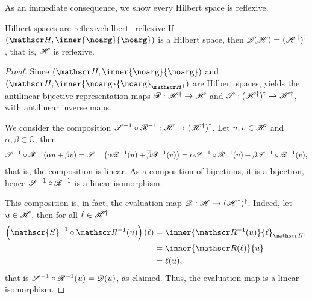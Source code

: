 As an immediate consequence, we show every Hilbert space is reflexive.
\begin{theorem}{Hilbert spaces are reflexive}{hilbert_reflexive}
    If \((\hilbert, \inner{\noarg}{\noarg})\) is a Hilbert space, then \(\mathscr{D}(\mathscr{H}) = (\mathscr{H}^\dag)^\dag\), that is, \(\mathscr{H}\) is reflexive.
\end{theorem}
\begin{proof}
    Since \((\hilbert, \inner{\noarg}{\noarg})\) and \((\hilbert, \inner{\noarg}{\noarg}_{\hilbert^\dag})\) are Hilbert spaces,  yields the antilinear bijective representation maps \(\mathscr{R} : \mathscr{H}^\dag \to \mathscr{H}\) and \(\mathscr{S} : (\mathscr{H}^\dag)^\dag \to \mathscr{H}^\dag\), with antilinear inverse maps.

    We consider the composition \(\mathscr{S}^{-1} \circ \mathscr{R}^{-1} : \mathscr{H} \to (\mathscr{H}^\dag)^\dag\). Let \(u, v \in \mathscr{H}\) and \(\alpha, \beta \in \mathbb{C}\), then
    \begin{equation*}
        \mathscr{S}^{-1} \circ \mathscr{R}^{-1} (\alpha u + \beta v) = \mathscr{S}^{-1}\left(\overline{\alpha} \mathscr{R}^{-1}(u) + \overline{\beta}\mathscr{R}^{-1}(v)\right) = \alpha \mathscr{S}^{-1} \circ \mathscr{R}^{-1}(u) + \beta \mathscr{S}^{-1} \circ \mathscr{R}^{-1}(v),
    \end{equation*}
    that is, the composition is linear. As a composition of bijections, it is a bijection, hence \(\mathscr{S}^{-1} \circ \mathscr{R}^{-1}\) is a linear isomorphism.

    This composition is, in fact, the evaluation map \(\mathscr{D} : \mathscr{H} \to (\mathscr{H}^\dag)^\dag\). Indeed, let \(u \in \mathscr{H}\), then for all \(\ell \in \mathscr{H}^\dag\)
    \begin{align*}
        \left(\mathscr{S}^{-1}\circ \riesz^{-1}(u)\right)(\ell) &= \inner{\riesz^{-1}(u)}{\ell}_{\hilbert^\dag}\\
                                                                &= \inner{\riesz(\ell)}{u}\\
                                                                &= \ell(u),
    \end{align*}
    that is \(\mathscr{S}^{-1} \circ \mathscr{R}^{-1}(u) = \mathscr{D}(u)\), as claimed. Thus, the evaluation map is a linear isomorphism.
\end{proof}
